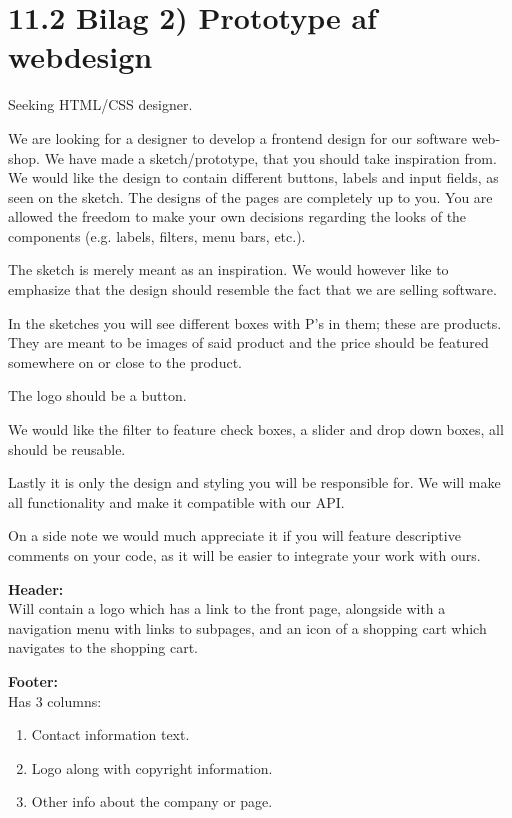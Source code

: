 \documentclass[11pt]{report}
\begin{document}
\section*{11.2 Bilag 2) Prototype af webdesign}

\noindent Seeking HTML/CSS designer.

\noindent We are looking for a designer to develop a frontend design for our software web-shop. We have made a sketch/prototype, that you should take inspiration from. We would like the design to contain different buttons, labels and input fields, as seen on the sketch. The designs of the pages are completely up to you. You are allowed the freedom to make your own decisions regarding the looks of the components (e.g. labels, filters, menu bars, etc.).

\noindent The sketch is merely meant as an inspiration. We would however like to emphasize that the design should resemble the fact that we are selling software.

\noindent In the sketches you will see different boxes with P’s in them; these are products. They are meant to be images of said product and the price should be featured somewhere on or close to the product.

\noindent The logo should be a button.

\noindent We would like the filter to feature check boxes, a slider and drop down boxes, all should be reusable.

\noindent Lastly it is only the design and styling you will be responsible for. We will make all functionality and make it compatible with our API.

\noindent On a side note we would much appreciate it if you will feature descriptive comments on your code, as it will be easier to integrate your work with ours.

\noindent \textbf{Header:}\\
\noindent Will contain a logo which has a link to the front page, alongside with a navigation menu with links to subpages, and an icon of a shopping cart which navigates to the shopping cart. 

\noindent \textbf{Footer:}\\
\noindent Has 3 columns:
\begin{enumerate}
  \item Contact information text.
  \item Logo along with copyright information.
  \item Other info about the company or page.
\end{enumerate}
\end{document}
